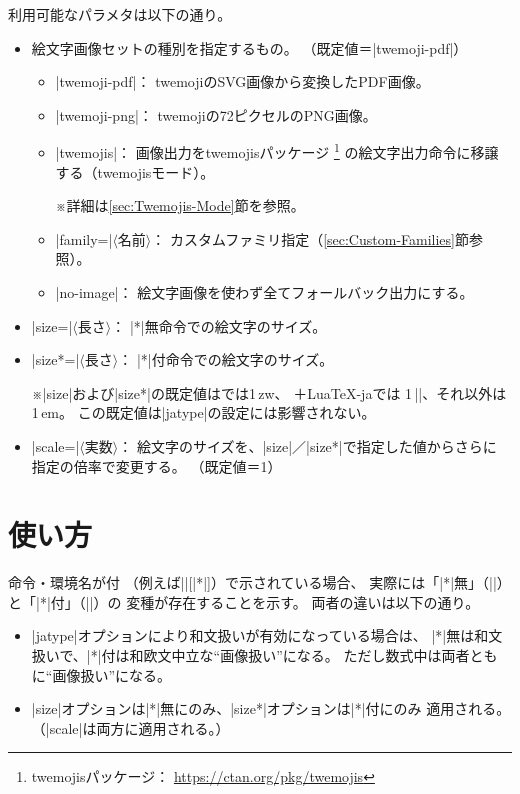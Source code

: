 \documentclass[a4paper]{ltjsarticle}
\renewcommand{\headfont}{\romanseries{sbc}\sffamily}
\newcommand{\Pkg}[1]{\textsf{#1}}
\newcommand{\Meta}[1]{$\langle$\mbox{}#1\mbox{}$\rangle$}
\newcommand{\Note}{\par\noindent ※}
\newcommand{\Means}{：\quad}
\newcommand{\／}{\mbox{}／\mbox{}}
\newcommand{\EG}{\eghostguarded}
\providecommand{\Strong}[1]{{\headfont#1}}
\begin{document}
利用可能なパラメタは以下の通り。

\begin{itemize}
\item \Strong{絵文字画像セット}の種別を指定するもの。
  （既定値＝|twemoji-pdf|）
  \begin{itemize}
  \item |twemoji-pdf|\Means
    twemojiのSVG画像から変換したPDF画像。
  \item |twemoji-png|\Means
    twemojiの72ピクセルのPNG画像。
  \item |twemojis|\Means
    画像出力を\Pkg{twemojis}パッケージ
    \footnote{\Pkg{twemojis}パッケージ\Means
      \url{https://ctan.org/pkg/twemojis}}%
    の絵文字出力命令に移譲する（twemojisモード）。
    \Note 詳細は\ref{sec:Twemojis-Mode}節を参照。
  \item |family=|\Meta{名前}\Means
    カスタムファミリ指定（\ref{sec:Custom-Families}節参照）。
  \item |no-image|\Means
    絵文字画像を使わず全てフォールバック出力にする。
  \end{itemize}

\item |size=|\Meta{長さ}\Means
  |*|無命令での絵文字のサイズ。
\item |size*=|\Meta{長さ}\Means
  |*|付命令での絵文字のサイズ。
  \Note |size|および|size*|の既定値は\EG{(u)\pLaTeX}では1\,zw、
  {\LuaLaTeX}＋\Pkg{LuaTeX-ja}では 1\,|\zw|、それ以外は1\,em。
  この既定値は|jatype|の設定には影響されない。

\item |scale=|\Meta{実数}\Means
  絵文字のサイズを、|size|\／|size*|で指定した値からさらに
  指定の倍率で変更する。
  （既定値＝1）
\end{itemize}


\section{使い方}
\label{sec:Usage}

命令・環境名が\EG{[|*|]}付
（例えば||[|*|]）で示されている場合、
実際には「|*|無」（||）と「|*|付」（||）の
変種が存在することを示す。
両者の違いは以下の通り。

\begin{itemize}
\item |jatype|オプションにより和文扱いが有効になっている場合は、
  |*|無は和文扱いで、|*|付は和欧文中立な“画像扱い”になる。
  ただし数式中は両者ともに“画像扱い”になる。
\item |size|オプションは|*|無にのみ、|size*|オプションは|*|付にのみ
  適用される。
  （|scale|は両方に適用される。）
\end{itemize}
\end{document}
